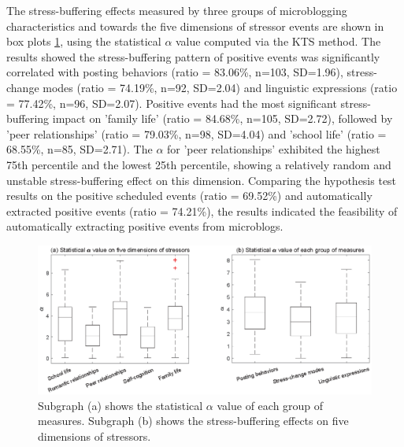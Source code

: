 The stress-buffering effects measured by three groups of microblogging characteristics
and towards the five dimensions of stressor events are shown in box plots \ref{fig:correlation},
using the statistical $\alpha$ value computed via the KTS method.
The results showed the stress-buffering pattern of positive events
was significantly correlated with posting behaviors (ratio = 83.06\%, n=103, SD=1.96),
stress-change modes (ratio = 74.19\%, n=92, SD=2.04) and linguistic expressions (ratio = 77.42\%, n=96, SD=2.07).
Positive events had the most significant stress-buffering impact on 'family life' (ratio = 84.68\%, n=105, SD=2.72),
followed by 'peer relationships' (ratio = 79.03\%, n=98, SD=4.04) and 'school life' (ratio = 68.55\%, n=85, SD=2.71).
The $\alpha$ for 'peer relationships' exhibited the highest 75th percentile and the lowest 25th percentile,
showing a relatively random and unstable stress-buffering effect on this dimension.
Comparing the hypothesis test results on the positive scheduled events (ratio = 69.52\%)
and automatically extracted positive events (ratio = 74.21\%),
the results indicated the feasibility of automatically extracting positive events from microblogs.

\begin{figure}
\centering
\includegraphics[width=\linewidth]{figs/cor.eps}%
\caption{\small{ Subgraph (a) shows the statistical $\alpha$ value of each group of measures.
Subgraph (b) shows the stress-buffering effects on five dimensions of stressors.}}
\label{fig:correlation}
\end{figure}

